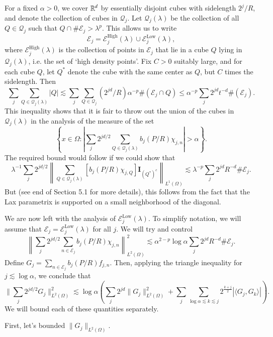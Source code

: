 For a fixed $\alpha > 0$, we cover $\operatorname{\mathbb{R}}^d$ by essentially disjoint cubes with sidelength $2^j / R$, and denote the collection of cubes in $\mathcal{Q}_j$. Let $\mathcal{Q}_j(\lambda)$ be the collection of all $Q \in \mathcal{Q}_j$ such that $Q \cap \# \mathcal{E}_j > \lambda^p$. This allows us to write
%
\[ \mathcal{E}_j = \mathcal{E}^{\text{High}}_j(\lambda) \cup \mathcal{E}^{\text{Low}}_j(\lambda), \]
%
where $\mathcal{E}^{\text{High}}_j(\lambda)$ is the collection of points in $\mathcal{E}_j$ that lie in a cube $Q$ lying in $\mathcal{Q}_j(\lambda)$, i.e. the set of `high density points'. Fix $C > 0$ suitably large, and for each cube $Q$, let $Q^*$ denote the cube with the same center as $Q$, but $C$ times the sidelength. Then
%
\[ \sum_j \sum_{Q \in \mathcal{Q}_j(\lambda)} |Q| \lesssim \sum_j \sum_{Q \in \mathcal{Q}_j} (2^{jd} / R) \alpha^{-p} \#( \mathcal{E}_j \cap Q ) \leq \alpha^{-p} \sum_j 2^{jd} t^{-d} \#(\mathcal{E}_j). \]
%
This inequality shows that it is fair to throw out the union of the cubes in $\mathcal{Q}_j(\lambda)$ in the analysis of the measure of the set
%
\[ \left\{ x \in \Omega : \left| \sum_j 2^{jd/2} \sum_{Q \in \mathcal{Q}_j(\lambda)} b_j(P/R) \chi_{j,n} \right| > \alpha \right\}. \]
%
The required bound would follow if we could show that
%
\[ \lambda^{-1} \sum_j 2^{jd/2} \left\| \sum_{Q \in \mathcal{Q}_j(\lambda)} [ b_j(P/R) \chi_{j,Q} ] \mathbf{I}_{(Q^*)^c} \right\|_{L^1(\Omega)} \lesssim \lambda^{-p} \sum_j 2^{jd} R^{-d} \# \mathcal{E}_j. \]
%
But (see end of Section 5.1 for more details), this follows from the fact that the Lax parametrix is supported on a small neighborhood of the diagonal.

We are now left with the analysis of $\mathcal{E}_j^{\text{Low}}(\lambda)$. To simplify notation, we will assume that $\mathcal{E}_j = \mathcal{E}_j^{\text{Low}}(\lambda)$ for all $j$. We will try and control
%
\[ \left\| \sum_j 2^{jd/2} \sum_{n \in \mathcal{E}_j} b_j(P/R) \chi_{j,n} \right\|_{L^2(\Omega)}^2 \lesssim \alpha^{2 - p} \log \alpha \sum_j 2^{jd} R^{-d} \# \mathcal{E}_j. \]
%
Define $G_j = \sum_{n \in \mathcal{E}_j} b_j(P/R) f_{j,n}$. Then, applying the triangle inequality for $j \lesssim \log \alpha$, we conclude that
%
\[ \| \sum_j 2^{jd/2} G_j \|_{L^2(\Omega)}^2 \lesssim \log \alpha \left( \sum_j 2^{jd} \| G_j \|_{L^2(\Omega)}^2 + \sum_j \sum_{\log \alpha \lesssim k \lesssim j} 2^{ \frac{k+j}{2} } |\langle G_j, G_k \rangle| \right). \]
%
We will bound each of these quantities separately.

First, let's bounded $\| G_j \|_{L^2(\Omega)}$.







